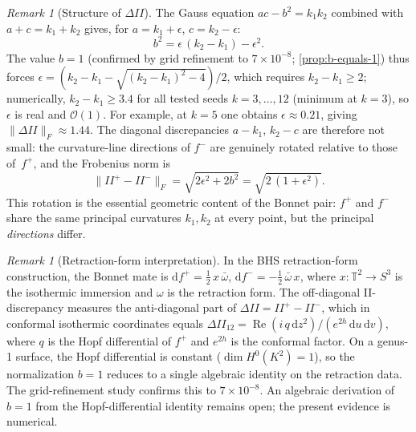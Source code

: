 \documentclass[11pt,a4paper]{article}
\theoremstyle{plain}
\theoremstyle{definition}
\theoremstyle{remark}
\newtheorem{remark}[theorem]{Remark}
\newcommand{\T}{\mathbb{T}}             %
\newcommand{\dd}{\mathrm{d}}
\newcommand{\norm}[1]{\lVert #1 \rVert}
\newcommand{\Oo}{\mathcal{O}}
\begin{document}
\begin{remark}[Structure of $\Delta II$]\label{rem:DeltaII-structure}
  The Gauss equation $ac - b^2 = k_1 k_2$ combined with
  $a + c = k_1 + k_2$ gives, for $a = k_1 + \epsilon$,
  $c = k_2 - \epsilon$:
  \[
    b^2 = \epsilon\,(k_2 - k_1) - \epsilon^2.
  \]
  The value $b = 1$ (confirmed by grid refinement to
  $7 \times 10^{-8}$; \cref{prop:b-equals-1}) thus forces
  $\epsilon = (k_2 - k_1 - \sqrt{(k_2-k_1)^2 - 4})/2$,
  which requires $k_2 - k_1 \ge 2$; numerically,
  $k_2 - k_1 \ge 3.4$ for all tested seeds $k = 3,\ldots,12$
  (minimum at $k = 3$), so $\epsilon$ is real and $\Oo(1)$.
  For example, at $k = 5$ one obtains
  $\epsilon \approx 0.21$, giving
  $\norm{\Delta II}_F \approx 1.44$.
  The diagonal discrepancies $a - k_1$, $k_2 - c$ are
  therefore not small:
  the curvature-line directions of $f^-$ are genuinely rotated
  relative to those of~$f^+$, and the Frobenius norm is
  \begin{equation}
    \norm{II^+ - II^-}_F
    = \sqrt{2\epsilon^2 + 2b^2}
    = \sqrt{2\,(1 + \epsilon^2)}.
    \label{eq:DeltaII-num}
  \end{equation}
  This rotation is the essential geometric content of the
  Bonnet pair: $f^+$ and $f^-$ share the same principal
  curvatures $k_1, k_2$ at every point, but the principal
  \emph{directions} differ.
\end{remark}

\begin{remark}[Retraction-form interpretation]\label{rem:retraction-b1}
  In the BHS retraction-form construction, the Bonnet mate is
  $\dd f^+ = \tfrac{1}{2}\,x\,\bar\omega$,
  $\dd f^- = -\tfrac{1}{2}\,\bar\omega\,x$,
  where $x : \T^2 \to S^3$ is the isothermic immersion and
  $\omega$ is the retraction form.
  The off-diagonal II-discrepancy measures the anti-diagonal part of
  $\Delta II = II^+ - II^-$, which in conformal isothermic
  coordinates equals
  $\Delta II_{12} = \operatorname{Re}(i\,q\,\dd z^2)
  /(e^{2h}\,\dd u\,\dd v)$,
  where $q$ is the Hopf differential of $f^+$ and $e^{2h}$ is the conformal factor.
  On a genus-1 surface, the Hopf differential is constant
  ($\dim H^0(K^2) = 1$), so the normalization $b = 1$
  reduces to a single algebraic identity on the retraction data.
  The grid-refinement study confirms this to $7 \times 10^{-8}$.
  An algebraic derivation of $b = 1$ from the
  Hopf-differential identity remains open;
  the present evidence is numerical.
\end{remark}
\end{document}
